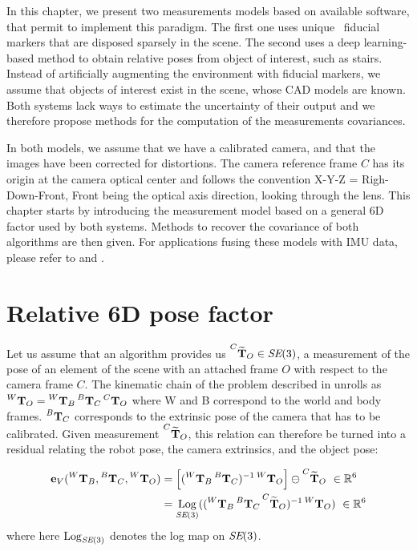 In this chapter, we present two measurements models based on available software, that permit to implement this paradigm. The first one 
uses unique \apriltag\ fiducial markers \cite{wang2016iros} that are disposed sparsely in the scene. The second uses a deep learning-based method \cite{labbe2020cosypose}
to obtain relative poses from object of interest, such as stairs. Instead of artificially augmenting the environment with fiducial markers, we assume 
that objects of interest exist in the scene, whose CAD models are known. 
Both systems lack ways to estimate the uncertainty of their output and we therefore propose methods for the computation of the measurements covariances.

In both models, we assume that we have a calibrated camera, and that the images have been corrected for distortions. The camera reference frame $C$ has its origin at 
the camera optical center and follows the convention X-Y-Z = Righ-Down-Front, Front being the optical axis direction, looking through the lens. This chapter starts by 
introducing the measurement model based on a general 6D factor used by both systems. Methods to recover the covariance of both algorithms are then given. 
For applications fusing these models with IMU data, please refer to  and .



\section{Relative 6D pose factor}
Let us assume that an algorithm provides us $\prescript{C}{}{\widetilde{{\bf T}}}_{O} \in \textit{SE}(3)$, a measurement of the pose of an element 
of the scene with an attached frame $O$ with respect to the camera frame $C$.
The kinematic chain of the problem described in  unrolls as 
$\prescript{W}{}{{\bf T}}_{O} = \prescript{W}{}{{\bf T}}_{B}\prescript{B}{}{{\bf T}}_{C}\prescript{C}{}{{\bf T}}_{O}$ where W and B correspond to the world and body frames. $\prescript{B}{}{{\bf T}}_{C}$ corresponds to the extrinsic pose 
of the camera that has to be calibrated.
Given measurement $\prescript{C}{}{\widetilde{{\bf T}}}_{O}$, this relation can therefore be turned into a residual relating 
the robot pose, the camera extrinsics, and the object pose:

\begin{align}
    {\bf e}_V (\prescript{W}{}{{\bf T}}_{B}, \prescript{B}{}{{\bf T}}_{C}, \prescript{W}{}{{\bf T}}_{O}) 
    &= \left[ (\prescript{W}{}{{\bf T}}_{B}\prescript{B}{}{{\bf T}}_{C})^{-1}\prescript{W}{}{{\bf T}}_{O} \right] \ominus \prescript{C}{}{\widetilde{{\bf T}}}_{O} ~ \in \mathbb{R}^6 \\
    &= \operatorname*{Log}_{\textit{SE}(3)} ( (\prescript{W}{}{{\bf T}}_{B} \prescript{B}{}{{\bf T}}_{C} \prescript{C}{}{\widetilde{{\bf T}}}_{O})^{-1} \prescript{W}{}{{\bf T}}_{O}) ~ \in \mathbb{R}^6
\end{align}
%
where here $\operatorname*{Log}_{\textit{SE}(3)}$ denotes the log map on $\textit{SE}(3)$.

